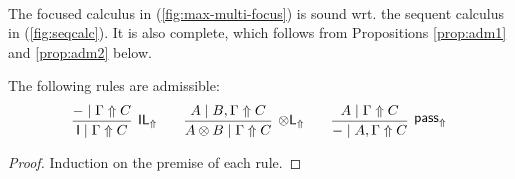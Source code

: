 \documentclass[runningheads]{llncs}
\renewcommand{\vec}{\overrightarrow}
\newcommand{\tl}{\otimes \mathsf{L}}
\newcommand{\tr}{\otimes \mathsf{R}}
\newcommand{\lleft}{{\multimap}\mathsf{L}}
\newcommand{\pass}{\mathsf{pass}}
\newcommand{\M}{\mathsf{M}}
\newcommand{\unitl}{\mathsf{IL}}
\newcommand{\unitr}{\mathsf{IR}}
\newcommand{\IR}{\unitr}
\newcommand{\ot}{\otimes}
\newcommand{\lolli}{\multimap}
\newcommand{\I}{\mathsf{I}}
\newcommand{\LI}{\mathsf{LI}}
\newcommand{\Pass}{\mathsf{P}}
\newcommand{\xvdash}{\vdash^{x}}
\newcommand{\niccolo}[1]{{\color{red}\textbf{Niccol{\`o}: }#1}}
\newcommand{\up}{\Uparrow}
\newcommand{\dn}{\Downarrow}
\newcommand{\sw}{\mathsf{sw}}
\newcommand{\blurLR}{\mathsf{blur_{M}}}
\begin{document}
\begin{equation}
\begin{array}{c}
  \end{array}
\end{equation}

The focused calculus in (\ref{fig:max-multi-focus}) is sound wrt. the sequent calculus in (\ref{fig:seqcalc}). It
is also complete, which follows from Propositions \ref{prop:adm1}
and \ref{prop:adm2} below.
\begin{proposition}\label{prop:adm1}
  The following rules are admissible:
  \[
      \infer[\unitl_\up]{\I \mid \Gamma \up C}{- \mid \Gamma \up C}
    \qquad
    \infer[\tl_\up]{A \ot B \mid\Gamma \up C}{A \mid B , \Gamma \up C}
    \qquad
    \infer[\pass_\up]{- \mid A , \Gamma \up C }{
      A\mid \Gamma \up C
    }
    \]
\end{proposition}
\begin{proof}
  Induction on the premise of each rule.
\end{proof}
\end{document}

